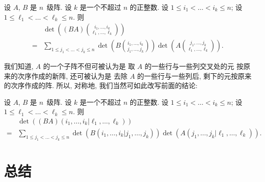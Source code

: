 \begin{theorem}
    设 \(A\), \(B\) 是 \(n\)~级阵.
    设 \(k\) 是一个不超过 \(n\) 的正整数.
    设 \(1 \leq i_1 < \dots < i_k \leq n\);
    设 \(1 \leq \ell_1 < \dots < \ell_k \leq n\).
    则
    \begin{align*}
             & \det {\left(
            (BA)\binom{i_1,\dots,i_k}{\ell_1,\dots,\ell_k}
            \right)}
        \\
        = {} & \sum_{1 \leq j_1 < \dots < j_k \leq n}
        {
            \det {\left(
                B\binom{i_1, \dots, i_k}{j_1, \dots, j_k}
                \right)}
            \det {\left(
                A\binom{j_1, \dots, j_k}{\ell_1, \dots, \ell_k}
                \right)}
        }.
    \end{align*}
\end{theorem}

我们知道, \(A\) 的一个子阵不但可被认为是%
取 \(A\) 的一些行与一些列交叉处的元%
按原来的次序作成的新阵,
还可被认为是%
去除 \(A\) 的一些行与一些列后,
剩下的元按原来的次序作成的阵.
所以, 对称地, 我们当然可如此改写前面的结论:

\begin{theorem}
    设 \(A\), \(B\) 是 \(n\)~级阵.
    设 \(k\) 是一个不超过 \(n\) 的正整数.
    设 \(1 \leq i_1 < \dots < i_k \leq n\);
    设 \(1 \leq \ell_1 < \dots < \ell_k \leq n\).
    则
    \begin{align*}
             & \det {(
        (BA)({i_1,\dots,i_k}|{\ell_1,\dots,\ell_k})
        )}
        \\
        = {} & \sum_{1 \leq j_1 < \dots < j_k \leq n}
        {
        \det {(
        B({i_1, \dots, i_k}|{j_1, \dots, j_k})
        )}
        \det {(
        A({j_1, \dots, j_k}|{\ell_1, \dots, \ell_k})
        )}
        }.
    \end{align*}
\end{theorem}











\section{总结}


